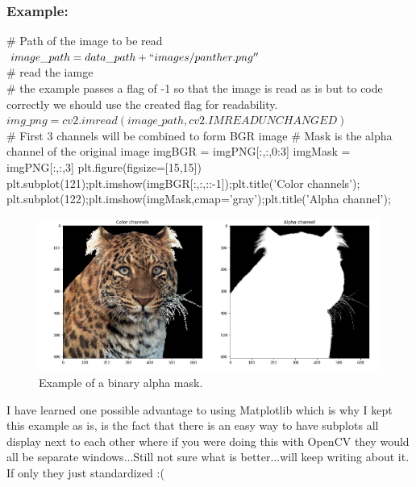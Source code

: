\documentclass[fleqn]{article}
\begin{document}
    \subsubsection{Example: }
      \begin{center}
        \# Path of the image to be read\\
        $image\_path = data\_path + ``images/panther.png''$ \\[0.25in]

        \# read the iamge\\
        \# the example passes a flag of -1 so that the image is read as is but to code correctly we should use the created flag for readability. \\
        $img\_png = cv2.imread(image\_path, cv2.IMREADUNCHANGED)$ \\[0.25in]

        \# First 3 channels will be combined to form BGR image
        \# Mask is the alpha channel of the original image
        imgBGR = imgPNG[:,:,0:3]
        imgMask = imgPNG[:,:,3]
        plt.figure(figsize=[15,15])
        plt.subplot(121);plt.imshow(imgBGR[:,:,::-1]);plt.title('Color channels');
        plt.subplot(122);plt.imshow(imgMask,cmap='gray');plt.title('Alpha channel');
      \end{center}

      \begin{figure}[h]
      \centering
      \includegraphics[width=500pt]{alphamask.png}
      \caption{\label{fig:alphamask}Example of a binary alpha mask.}
      \end{figure}

      I have learned one possible advantage to using Matplotlib which is why I kept this example as is, is the fact that there is an easy way to have subplots all display next to each other where if you were doing this with OpenCV they would all be separate windows...Still not sure what is better...will keep writing about it. If only they just standardized :(
\end{document}
